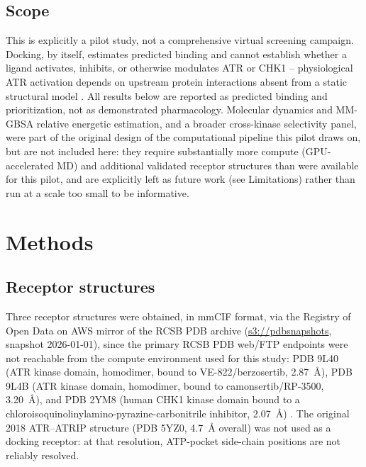 \documentclass[11pt]{article}
\begin{document}
\subsection*{Scope}

This is explicitly a pilot study, not a comprehensive virtual screening
campaign. Docking, by itself, estimates predicted binding and cannot
establish whether a ligand activates, inhibits, or otherwise modulates
ATR or CHK1 -- physiological ATR activation depends on upstream protein
interactions absent from a static structural model
\citep{kumagai2006,bass2016}. All results below are reported as predicted
binding and prioritization, not as demonstrated pharmacology. Molecular
dynamics and MM-GBSA relative energetic estimation, and a broader
cross-kinase selectivity panel, were part of the original design of the
computational pipeline this pilot draws on, but are not included here:
they require substantially more compute (GPU-accelerated MD) and additional
validated receptor structures than were available for this pilot, and are
explicitly left as future work (see Limitations) rather than run at a scale
too small to be informative.

\section*{Methods}

\subsection*{Receptor structures}

Three receptor structures were obtained, in mmCIF format, via the
Registry of Open Data on AWS mirror of the RCSB PDB archive
(\url{s3://pdbsnapshots}, snapshot 2026-01-01), since the primary RCSB PDB
web/FTP endpoints were not reachable from the compute environment used for
this study: PDB 9L40 (ATR kinase domain, homodimer, bound to
VE-822/berzosertib, 2.87~{\AA}), PDB 9L4B (ATR kinase domain, homodimer,
bound to camonsertib/RP-3500, 3.20~{\AA}), and PDB 2YM8 (human CHK1 kinase
domain
bound to a chloroisoquinolinylamino-pyrazine-carbonitrile inhibitor,
2.07~{\AA}) \citep{wang2025}. The original 2018 ATR--ATRIP structure
(PDB 5YZ0, 4.7~{\AA} overall) was not used as a docking receptor: at that
resolution, ATP-pocket side-chain positions are not reliably resolved.
\end{document}
